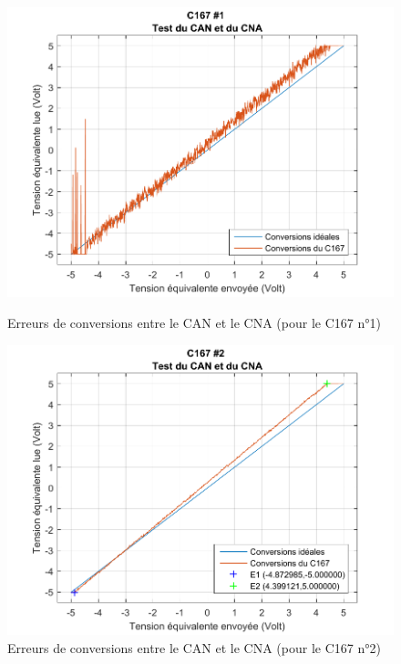 \begin{figure}[!ht]
\begin{minipage}[t]{.48\textwidth}

\centering 		
\includegraphics[width=.9\textwidth]{./V/images/CAN_CNA_mesures_1.pdf}
\caption{\label{fig:errCAN}Erreurs de conversions entre le CAN et le CNA (pour le C167 n°1)}
\end{minipage}\hfill%
\begin{minipage}[t]{.48\textwidth}
\centering 		
\includegraphics[width=.9\textwidth]{./V/images/CAN_CNA_mesures.pdf}
\caption{\label{fig:errCAN}Erreurs de conversions entre le CAN et le CNA (pour le C167 n°2)}
\end{minipage}
\end{figure}
\newpage

